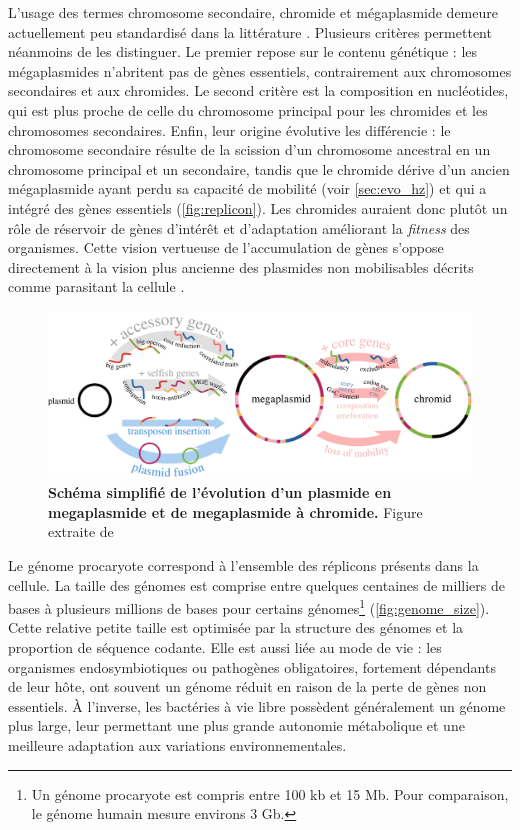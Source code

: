 L’usage des termes chromosome secondaire, chromide et mégaplasmide demeure actuellement peu standardisé dans la littérature \cite{hall_what_2021}. Plusieurs critères permettent néanmoins de les distinguer. Le premier repose sur le contenu génétique : les mégaplasmides n’abritent pas de gènes essentiels, contrairement aux chromosomes secondaires et aux chromides. Le second critère est la composition en nucléotides, qui est plus proche de celle du chromosome principal pour les chromides et les chromosomes secondaires. Enfin, leur origine évolutive les différencie : le chromosome secondaire résulte de la scission d’un chromosome ancestral en un chromosome principal et un secondaire, tandis que le chromide dérive d’un ancien mégaplasmide ayant perdu sa capacité de mobilité (voir \autoref{sec:evo_hz}) et qui a intégré des gènes essentiels (\autoref{fig:replicon}). Les chromides auraient donc plutôt un rôle de réservoir de gènes d’intérêt et d’adaptation améliorant la \textit{fitness} des organismes. Cette vision vertueuse de l'accumulation de gènes s'oppose directement à la vision plus ancienne des plasmides non mobilisables décrits comme parasitant la cellule \cite{levin_accessory_1993,lili_persistence_2007}.

\begin{figure}[htbp]
    \centering
    \includegraphics[width=.95\textwidth]{images/replicon.jpg}
    \caption[Évolution d'un plasmide en chromid]{\textbf{Schéma simplifié de l'évolution d'un plasmide en megaplasmide et de megaplasmide à chromide.} Figure extraite de \cite{hall_what_2021}}
    \label{fig:replicon}
\end{figure}

\newpage

Le génome procaryote correspond à l'ensemble des réplicons présents dans la cellule. La taille des génomes est comprise entre quelques centaines de milliers de bases à plusieurs millions de bases pour certains génomes\footnote{Un génome procaryote est compris entre 100 kb et 15 Mb. Pour comparaison, le génome humain mesure environs 3 Gb.} (\autoref{fig:genome_size}). Cette relative petite taille est optimisée par la structure des génomes et la proportion de séquence codante. Elle est aussi liée au mode de vie : les organismes endosymbiotiques ou pathogènes obligatoires, fortement dépendants de leur hôte, ont souvent un génome réduit en raison de la perte de gènes non essentiels. À l’inverse, les bactéries à vie libre possèdent généralement un génome plus large, leur permettant une plus grande autonomie métabolique et une meilleure adaptation aux variations environnementales.

